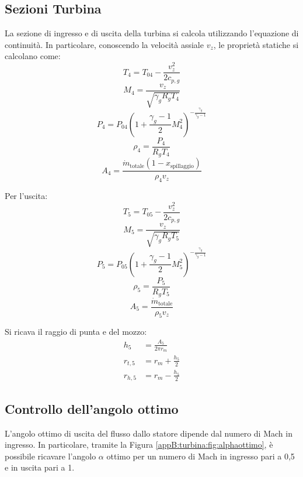 \subsection{Sezioni Turbina}
La sezione di ingresso e di uscita della turbina si calcola utilizzando l'equazione di continuità. In particolare, conoscendo la velocità assiale $v_z$, le proprietà statiche si calcolano come:
\begin{equation*}
    T_4 = T_{04} -\frac{v_z^2}{2c_{p,g}}
\end{equation*}
\begin{equation*}
    M_4 = \frac{v_z}{\sqrt{\gamma_gR_gT_4}}
\end{equation*}
\begin{equation*}
    P_4 =  P_{04} \left( 1 + \frac{\gamma_g - 1}{2} M_4^2 \right)^{-\frac{\gamma_g}{\gamma_g - 1}} 
\end{equation*}
\begin{equation*}
    \rho_4 = \frac{P_4}{R_g T_4} 
\end{equation*}
\begin{equation*}
    A_4 = \frac{\dot{m}_\text{totale}(1-x_\text{spillaggio})}{\rho_4 v_z}
\end{equation*}

Per l'uscita:
\begin{equation*}
    T_5 = T_{05} -\frac{v_z^2}{2c_{p,g}}
\end{equation*}
\begin{equation*}
    M_5 = \frac{v_z}{\sqrt{\gamma_gR_gT_5}}
\end{equation*}
\begin{equation*}
    P_5 =  P_{05} \left( 1 + \frac{\gamma_g - 1}{2} M_5^2 \right)^{-\frac{\gamma_g}{\gamma_g - 1}} 
\end{equation*}
\begin{equation*}
    \rho_5 = \frac{P_5}{R_g T_5} 
\end{equation*}
\begin{equation*}
    A_5 = \frac{\dot{m}_\text{totale}}{\rho_5 v_z}
\end{equation*}

Si ricava il raggio di punta e del mozzo:
\begin{align*}
    h_5 &= \frac{A_5}{2 \pi r_m} \\[6pt]
    r_{t,5} &= r_m + \frac{h_5}{2} \\[6pt]
r_{h,5} &= r_m - \frac{h_5}{2}
\end{align*}

\subsection{Controllo dell'angolo ottimo}
L'angolo ottimo di uscita del flusso dallo statore dipende dal numero di Mach in ingresso. In particolare, tramite la Figura \ref{appB:turbina:fig:alphaottimo}, è possibile ricavare l'angolo $\alpha$ ottimo per un numero di Mach in ingresso pari a 0,5 e in uscita pari a 1.

